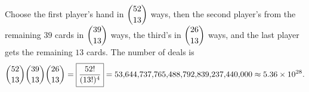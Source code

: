 Choose the first player's hand in $\dbinom{52}{13}$ ways, then the second player's from the remaining $39$ cards in $\dbinom{39}{13}$ ways, the third's in $\dbinom{26}{13}$ ways, and the last player gets the remaining $13$ cards. The number of deals is
\[
\dbinom{52}{13}\dbinom{39}{13}\dbinom{26}{13}=\boxed{\dfrac{52!}{(13!)^4}}=53{,}644{,}737{,}765{,}488{,}792{,}839{,}237{,}440{,}000\approx5.36\times10^{28}.
\]

